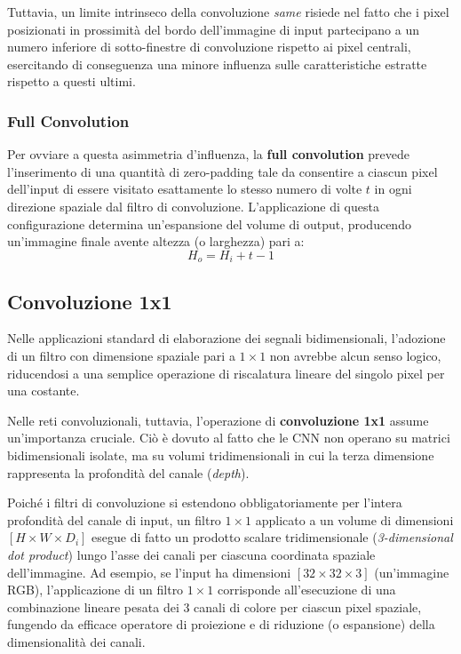 ﻿\documentclass[11pt, a4paper]{article}
\begin{document}
Tuttavia, un limite intrinseco della convoluzione \emph{same} risiede nel fatto che i pixel posizionati in prossimità del bordo dell'immagine di input partecipano a un numero inferiore di sotto-finestre di convoluzione rispetto ai pixel centrali, esercitando di conseguenza una minore influenza sulle caratteristiche estratte rispetto a questi ultimi.

\subsubsection{Full Convolution}
Per ovviare a questa asimmetria d'influenza, la \textbf{full convolution} prevede l'inserimento di una quantità di zero-padding tale da consentire a ciascun pixel dell'input di essere visitato esattamente lo stesso numero di volte $t$ in ogni direzione spaziale dal filtro di convoluzione. L'applicazione di questa configurazione determina un'espansione del volume di output, producendo un'immagine finale avente altezza (o larghezza) pari a:
\[
\boxed{H_o = H_i + t - 1}
\]

\subsection{Convoluzione 1x1}

Nelle applicazioni standard di elaborazione dei segnali bidimensionali, l'adozione di un filtro con dimensione spaziale pari a $1 \times 1$ non avrebbe alcun senso logico, riducendosi a una semplice operazione di riscalatura lineare del singolo pixel per una costante.

Nelle reti convoluzionali, tuttavia, l'operazione di \textbf{convoluzione 1x1} assume un'importanza cruciale. Ciò è dovuto al fatto che le CNN non operano su matrici bidimensionali isolate, ma su volumi tridimensionali in cui la terza dimensione rappresenta la profondità del canale (\emph{depth}).

Poiché i filtri di convoluzione si estendono obbligatoriamente per l'intera profondità del canale di input, un filtro $1 \times 1$ applicato a un volume di dimensioni $[H \times W \times D_i]$ esegue di fatto un prodotto scalare tridimensionale (\emph{3-dimensional dot product}) lungo l'asse dei canali per ciascuna coordinata spaziale dell'immagine.
Ad esempio, se l'input ha dimensioni $[32 \times 32 \times 3]$ (un'immagine RGB), l'applicazione di un filtro $1 \times 1$ corrisponde all'esecuzione di una combinazione lineare pesata dei 3 canali di colore per ciascun pixel spaziale, fungendo da efficace operatore di proiezione e di riduzione (o espansione) della dimensionalità dei canali.
\end{document}
